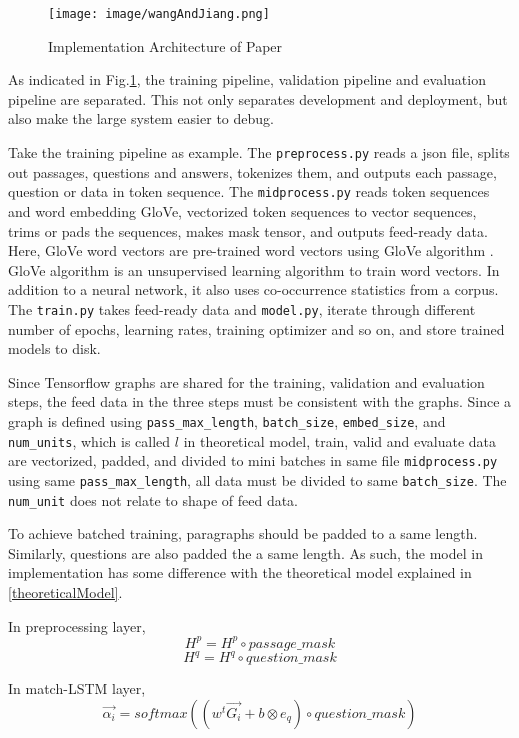 \documentclass[12pt]{article}
\begin{document}
\begin{figure}[h]
\texttt{[image: image/wangAndJiang.png]}
\centering
\caption{Implementation Architecture of Paper \cite{wang2016machine}}
\label{fig:wangAndJiang}
\end{figure}

As indicated in Fig.\ref{fig:wangAndJiang}, the training pipeline, validation pipeline and evaluation pipeline are separated. This not only separates development and deployment, but also make the large system easier to debug.

Take the training pipeline as example. The \texttt{preprocess.py} reads a json file, splits out passages, questions and answers, tokenizes them, and outputs each passage, question or data in token sequence. The \texttt{midprocess.py} reads token sequences and word embedding GloVe, vectorized token sequences to vector sequences, trims or pads the sequences, makes mask tensor, and outputs feed-ready data. Here, GloVe word vectors are pre-trained word vectors using GloVe algorithm \cite{pennington2014glove}. GloVe algorithm is an unsupervised learning algorithm to train word vectors. In addition to a neural network, it also uses co-occurrence statistics from a corpus. The \texttt{train.py} takes feed-ready data and \texttt{model.py}, iterate through different number of epochs, learning rates, training optimizer and so on, and store trained models to disk.


Since Tensorflow graphs are shared for the training, validation and evaluation steps, the feed data in the three steps must be consistent with the graphs. Since a graph is defined using \texttt{pass\_max\_length}, \texttt{batch\_size}, \texttt{embed\_size}, and \texttt{num\_units}, which is called $l$ in theoretical model, train, valid and evaluate data are vectorized, padded, and divided to mini batches in same file \texttt{midprocess.py} using same \texttt{pass\_max\_length}, all data must be divided to same \texttt{batch\_size}. The \texttt{num\_unit} does not relate to shape of feed data.


To achieve batched training, paragraphs should be padded to a same length. Similarly, questions are also padded the a same length. As such, the model in implementation has some difference with the theoretical model explained in \ref{theoreticalModel}.

In preprocessing layer,
$$H^p = H^p \circ passage\_mask$$
$$H^q = H^q \circ question\_mask$$

In match-LSTM layer,
$$\overrightarrow{\alpha _i} = softmax( (w^t\overrightarrow{G_i} + b \otimes e_q) \circ question\_mask)$$
\end{document}
